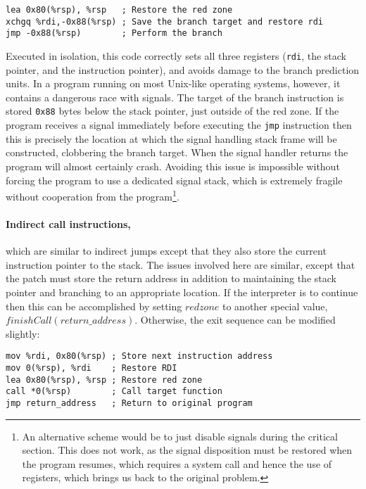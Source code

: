 \begin{verbatim}
lea 0x80(%rsp), %rsp   ; Restore the red zone
xchgq %rdi,-0x88(%rsp) ; Save the branch target and restore rdi
jmp -0x88(%rsp)        ; Perform the branch
\end{verbatim}

Executed in isolation, this code correctly sets all three registers
(\verb|rdi|, the stack pointer, and the instruction pointer), and
avoids damage to the branch prediction units.  In a program running on
most Unix-like operating systems, however, it contains a dangerous
race with signals.  The target of the branch instruction is stored
\verb|0x88| bytes below the stack pointer, just outside of the red
zone.  If the program receives a signal immediately before executing
the \verb|jmp| instruction then this is precisely the location at
which the signal handling stack frame will be constructed, clobbering
the branch target.  When the signal handler returns the program will
almost certainly crash.  Avoiding this issue is impossible without
forcing the program to use a dedicated signal stack, which is
extremely fragile without cooperation from the program\footnote{An
  alternative scheme would be to just disable signals during the
  critical section.  This does not work, as the signal disposition
  must be restored when the program resumes, which requires a system
  call and hence the use of registers, which brings us back to the
  original problem.}.



\paragraph{Indirect call instructions,} which are similar to indirect jumps
except that they also store the current instruction pointer to the
stack.  The issues involved here are similar,
except that the patch must store the return address in addition to
maintaining the stack pointer and branching to an appropriate
location.  If the interpreter is to continue then this can be
accomplished by setting $redzone$ to another special value,
$finishCall(return\_address)$.  Otherwise, the exit sequence can be
modified slightly:

\begin{verbatim}
mov %rdi, 0x80(%rsp) ; Store next instruction address
mov 0(%rsp), %rdi    ; Restore RDI
lea 0x80(%rsp), %rsp ; Restore red zone
call *0(%rsp)        ; Call target function
jmp return_address   ; Return to original program
\end{verbatim}

